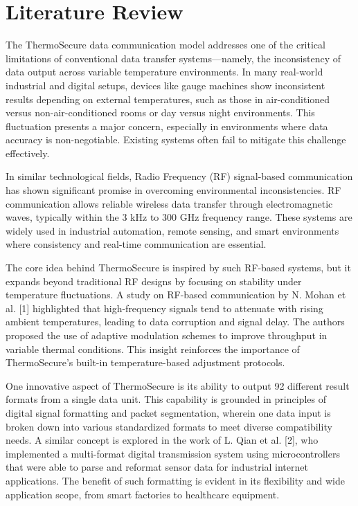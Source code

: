 \documentclass[12pt]{report}
\begin{document}
\section{Literature Review}
\begin{flushleft}
The ThermoSecure data communication model addresses one of the critical limitations of conventional data transfer systems—namely, the inconsistency of data output across variable temperature environments. In many real-world industrial and digital setups, devices like gauge machines show inconsistent results depending on external temperatures, such as those in air-conditioned versus non-air-conditioned rooms or day versus night environments. This fluctuation presents a major concern, especially in environments where data accuracy is non-negotiable. Existing systems often fail to mitigate this challenge effectively.

In similar technological fields, Radio Frequency (RF) signal-based communication has shown significant promise in overcoming environmental inconsistencies. RF communication allows reliable wireless data transfer through electromagnetic waves, typically within the 3 kHz to 300 GHz frequency range. These systems are widely used in industrial automation, remote sensing, and smart environments where consistency and real-time communication are essential.

The core idea behind ThermoSecure is inspired by such RF-based systems, but it expands beyond traditional RF designs by focusing on stability under temperature fluctuations. A study on RF-based communication by N. Mohan et al. [1] highlighted that high-frequency signals tend to attenuate with rising ambient temperatures, leading to data corruption and signal delay. The authors proposed the use of adaptive modulation schemes to improve throughput in variable thermal conditions. This insight reinforces the importance of ThermoSecure's built-in temperature-based adjustment protocols.

One innovative aspect of ThermoSecure is its ability to output 92 different result formats from a single data unit. This capability is grounded in principles of digital signal formatting and packet segmentation, wherein one data input is broken down into various standardized formats to meet diverse compatibility needs. A similar concept is explored in the work of L. Qian et al. [2], who implemented a multi-format digital transmission system using microcontrollers that were able to parse and reformat sensor data for industrial internet applications. The benefit of such formatting is evident in its flexibility and wide application scope, from smart factories to healthcare equipment.
\end{flushleft}
\end{document}
